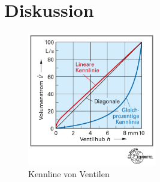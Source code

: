 \chapter{Diskussion}
\label{sec:diskussion}


\begin{figure}[h!]
	\centering
	\includegraphics[width=0.5\textwidth]{img/035-3}
	\caption{Kennline von Ventilen \cite[S.35, Bild 3]{Ignatowitz.2013}}
	\label{fig:kennlinie_ct}
\end{figure}
\FloatBarrier

